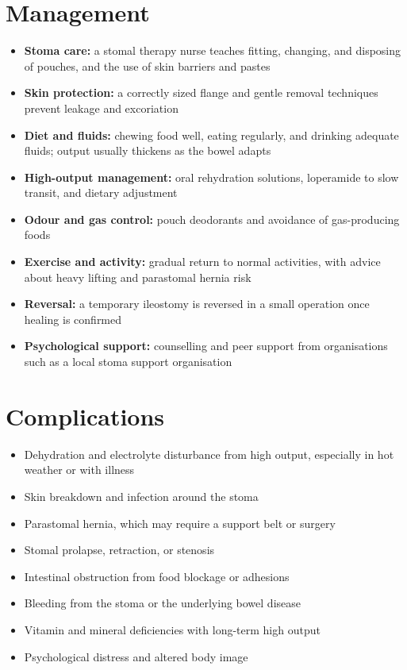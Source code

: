 \section*{Management}
\begin{itemize}
    \item \textbf{Stoma care:} a stomal therapy nurse teaches fitting, changing, and disposing of pouches, and the use of skin barriers and pastes
    \item \textbf{Skin protection:} a correctly sized flange and gentle removal techniques prevent leakage and excoriation
    \item \textbf{Diet and fluids:} chewing food well, eating regularly, and drinking adequate fluids; output usually thickens as the bowel adapts
    \item \textbf{High-output management:} oral rehydration solutions, loperamide to slow transit, and dietary adjustment
    \item \textbf{Odour and gas control:} pouch deodorants and avoidance of gas-producing foods
    \item \textbf{Exercise and activity:} gradual return to normal activities, with advice about heavy lifting and parastomal hernia risk
    \item \textbf{Reversal:} a temporary ileostomy is reversed in a small operation once healing is confirmed
    \item \textbf{Psychological support:} counselling and peer support from organisations such as a local stoma support organisation
\end{itemize}

\section*{Complications}
\begin{itemize}
    \item Dehydration and electrolyte disturbance from high output, especially in hot weather or with illness
    \item Skin breakdown and infection around the stoma
    \item Parastomal hernia, which may require a support belt or surgery
    \item Stomal prolapse, retraction, or stenosis
    \item Intestinal obstruction from food blockage or adhesions
    \item Bleeding from the stoma or the underlying bowel disease
    \item Vitamin and mineral deficiencies with long-term high output
    \item Psychological distress and altered body image
\end{itemize}

